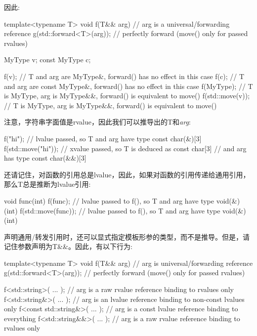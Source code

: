 因此:\par

\begin{codebox}[cpp]
template<typename T>
void f(T&& arg) // arg is a universal/forwarding reference
{
  g(std::forward<T>(arg)); // perfectly forward (move() only for passed rvalues)
}

MyType v;
const MyType c;

f(v); // T and arg are MyType&, forward() has no effect in this case
f(c); // T and arg are const MyType&, forward() has no effect in this case
f(MyType{}); // T is MyType, arg is MyType&&, forward() is equivalent to move()
f(std::move(v)); // T is MyType, arg is MyType&&, forward() is equivalent to move()
\end{codebox}

注意，字符串字面值是rvalue，因此我们可以推导出的T和\textit{arg}:\par

\begin{codebox}[cpp]
f("hi"); // lvalue passed, so T and arg have type const char(&)[3]
f(std::move("hi")); // xvalue passed, so T is deduced as const char[3]
// and arg has type const char(&&)[3]
\end{codebox}

还请记住，对函数的引用总是lvalue，因此，如果对函数的引用传递给通用引用，那么T总是推断为lvalue引用:\par

\begin{codebox}[cpp]
void func(int) {
}
f(func); // lvalue passed to f(), so T and arg have type void(&)(int)
f(std::move(func)); // lvalue passed to f(), so T and arg have type void(&)(int)
\end{codebox}


声明通用/转发引用时，还可以显式指定模板形参的类型，而不是推导。但是，请记住参数声明为T\&\&。因此，有以下行为:\par

\begin{codebox}[cpp]
template<typename T>
void f(T&& arg) // arg is universal/forwarding reference
{
  g(std::forward<T>(arg)); // perfectly forward (move() only for passed rvalues)
}

f<std::string>( ... ); // arg is a raw rvalue reference binding to rvalues only
f<std::string&>( ... ); // arg is an lvalue reference binding to non-const lvalues only
f<const std::string&>( ... ); // arg is a const lvalue reference binding to everything
f<std::string&&>( ... ); // arg is a raw rvalue reference binding to rvalues only
\end{codebox}

